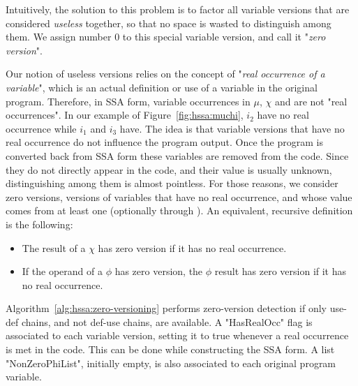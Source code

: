 Intuitively, the solution to this problem is to factor all variable versions that are considered \emph{useless} together, so that no space is wasted to distinguish among them. We assign number 0 to this special variable version, and call it "{\em zero version}".

Our notion of useless versions relies on the concept of "{\em real occurrence of a variable}", which is an actual definition or use of a variable in the original program. Therefore, in SSA form, variable occurrences in $\mu$, $\chi$ and \phifuns are not "real occurrences". In our example of Figure~\ref{fig:hssa:muchi}, $i_2$ have no real occurrence while $i_1$ and $i_3$ have. The idea is that variable versions that have no real occurrence do not influence the program output. Once the program is converted back from SSA form these variables are removed from the code.
Since they do not directly appear in the code, and their value is usually unknown, distinguishing among them is almost pointless.
For those reasons, we consider zero versions, versions of variables that have no real occurrence, and whose value comes from at least one \chifun (optionally through \phifuns). An equivalent, recursive definition is the following:
\begin{itemize}
\item The result of a $\chi$ has zero version if it has no real occurrence.
\item If the operand of a $\phi$ has zero version, the $\phi$ result has zero version if it has no real occurrence.
\end{itemize}

Algorithm~\ref{alg:hssa:zero-versioning} performs zero-version detection if only use-def chains, and not def-use chains, are available. A "HasRealOcc" flag is associated to each variable version, setting it to true whenever a real occurrence is met in the code. This can be done while constructing the SSA form. A list "NonZeroPhiList", initially empty, is also associated to each original program variable.

